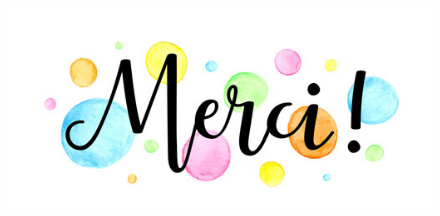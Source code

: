 \documentclass{beamer}
\begin{document}

%	
%	
%	


\begin{frame}
\begin{figure}[!h]
	\centering	
		\includegraphics[width=\textwidth]{images/merci.jpg}
	\end{figure}
\end{frame}

\end{document}
